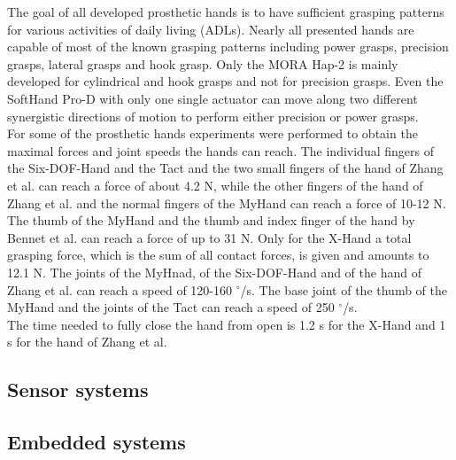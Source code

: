 \documentclass[a4paper, 10pt, conference]{ieeeconf}      %
\begin{document}
The goal of all developed prosthetic hands is to have sufficient grasping patterns for various activities of daily living (ADLs). Nearly all presented hands are capable of most of the known grasping patterns including power grasps, precision grasps, lateral grasps and hook grasp. Only the MORA Hap-2 is mainly developed for cylindrical and hook grasps and not for precision grasps. Even the SoftHand Pro-D with only one single actuator can move along two different synergistic directions of motion to perform either precision or power grasps.\\
For some of the prosthetic hands experiments were performed to obtain the maximal forces and joint speeds the hands can reach. The individual fingers of the Six-DOF-Hand and the Tact and the two small fingers of the hand of Zhang et al. can reach a force of about 4.2 N, while the other fingers of the hand of Zhang et al. and the normal fingers of the MyHand can reach a force of 10-12 N. The thumb of the MyHand and the thumb and index finger of the hand by Bennet et al. can reach a force of up to 31 N. Only for the X-Hand a total grasping force, which is the sum of all contact forces, is given and amounts to 12.1 N. The joints of the MyHnad, of the Six-DOF-Hand and of the hand of Zhang et al. can reach a speed of 120-160 $^\circ$/s. The base joint of the thumb of the MyHand and the joints of the Tact can reach a speed of 250 $^\circ$/s.\\
The time needed to fully close the hand from open is 1.2 s for the X-Hand and 1 s for the hand of Zhang et al.

\subsection{Sensor systems}

\subsection{Embedded systems}

\newpage



%
\end{document}
